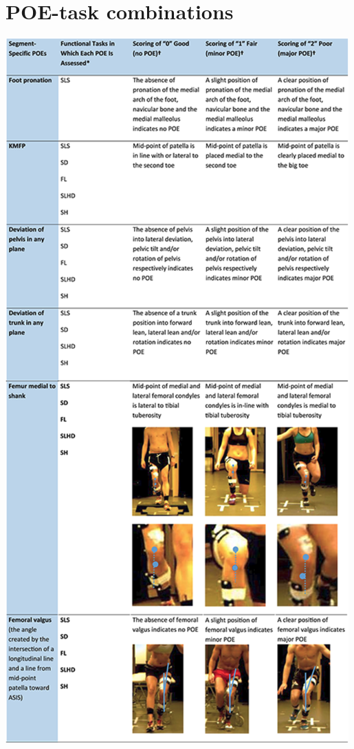 \appendix


\chapter[POE-task combinations]{POE-task combinations \cite{Nae2020b}} \label{app:poe-task}
  \begin{center}
    \includegraphics[trim=0 60 0 0, clip, height=0.95\textheight]{files/figs/app/poes-detailed-rot.png}
  \end{center}
